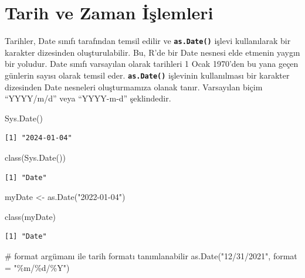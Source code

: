 \documentclass[
  letterpaper,
  DIV=11,
  numbers=noendperiod]{scrreprt}
\newenvironment{Shaded}{\begin{snugshade}}{\end{snugshade}}
\newcommand{\AttributeTok}[1]{\textcolor[rgb]{0.40,0.45,0.13}{#1}}
\newcommand{\CommentTok}[1]{\textcolor[rgb]{0.37,0.37,0.37}{#1}}
\newcommand{\FunctionTok}[1]{\textcolor[rgb]{0.28,0.35,0.67}{#1}}
\newcommand{\NormalTok}[1]{\textcolor[rgb]{0.00,0.23,0.31}{#1}}
\newcommand{\OtherTok}[1]{\textcolor[rgb]{0.00,0.23,0.31}{#1}}
\newcommand{\StringTok}[1]{\textcolor[rgb]{0.13,0.47,0.30}{#1}}
\begin{document}
\hypertarget{tarih-ve-zaman-iux15flemleri}{%
\chapter{Tarih ve Zaman İşlemleri}\label{tarih-ve-zaman-iux15flemleri}}

Tarihler, Date sınıfı tarafından temsil edilir ve
\textbf{\texttt{as.Date()}} işlevi kullanılarak bir karakter dizesinden
oluşturulabilir. Bu, R'de bir Date nesnesi elde etmenin yaygın bir
yoludur. Date sınıfı varsayılan olarak tarihleri 1 Ocak 1970'den bu yana
geçen günlerin sayısı olarak temsil eder. \textbf{\texttt{as.Date()}}
işlevinin kullanılması bir karakter dizesinden Date nesneleri
oluşturmamıza olanak tanır. Varsayılan biçim ``YYYY/m/d'' veya
``YYYY-m-d'' şeklindedir.

\begin{Shaded}
\begin{Highlighting}[]
\FunctionTok{Sys.Date}\NormalTok{()}
\end{Highlighting}
\end{Shaded}

\begin{verbatim}
[1] "2024-01-04"
\end{verbatim}

\begin{Shaded}
\begin{Highlighting}[]
\FunctionTok{class}\NormalTok{(}\FunctionTok{Sys.Date}\NormalTok{())}
\end{Highlighting}
\end{Shaded}

\begin{verbatim}
[1] "Date"
\end{verbatim}

\begin{Shaded}
\begin{Highlighting}[]
\NormalTok{myDate }\OtherTok{\textless{}{-}} \FunctionTok{as.Date}\NormalTok{(}\StringTok{"2022{-}01{-}04"}\NormalTok{)}

\FunctionTok{class}\NormalTok{(myDate)}
\end{Highlighting}
\end{Shaded}

\begin{verbatim}
[1] "Date"
\end{verbatim}

\begin{Shaded}
\begin{Highlighting}[]
\CommentTok{\# format argümanı ile tarih formatı tanımlanabilir}
\FunctionTok{as.Date}\NormalTok{(}\StringTok{"12/31/2021"}\NormalTok{, }\AttributeTok{format =} \StringTok{"\%m/\%d/\%Y"}\NormalTok{)}
\end{Highlighting}
\end{Shaded}
\end{document}
